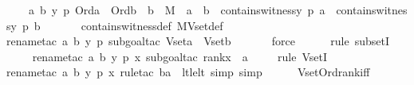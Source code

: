 \begin{isabellebody}
\ \ \ \ {\isachardoublequoteopen}{\isasymAnd}a\ b\ y\ p{\isachardot}{\kern0pt}\ Ord{\isacharparenleft}{\kern0pt}a{\isacharparenright}{\kern0pt}\ {\isasymLongrightarrow}\ Ord{\isacharparenleft}{\kern0pt}b{\isacharparenright}{\kern0pt}\ {\isasymLongrightarrow}\ b\ {\isasymin}\ M\ {\isasymLongrightarrow}\ a\ {\isasymle}\ b\ {\isasymLongrightarrow}\ contains{\isacharunderscore}{\kern0pt}witness{\isacharparenleft}{\kern0pt}y{\isacharcomma}{\kern0pt}\ p{\isacharcomma}{\kern0pt}\ a{\isacharparenright}{\kern0pt}\ {\isasymLongrightarrow}\ contains{\isacharunderscore}{\kern0pt}witness{\isacharparenleft}{\kern0pt}y{\isacharcomma}{\kern0pt}\ p{\isacharcomma}{\kern0pt}\ b{\isacharparenright}{\kern0pt}{\isachardoublequoteclose}\ \isanewline
\ \ \ \ \isamarkupfalse%
\ contains{\isacharunderscore}{\kern0pt}witness{\isacharunderscore}{\kern0pt}def\ MVset{\isacharunderscore}{\kern0pt}def\ \isanewline
\ \ \ \ \isamarkupfalse%
{\isacharparenleft}{\kern0pt}rename{\isacharunderscore}{\kern0pt}tac\ a\ b\ y\ p{\isacharcomma}{\kern0pt}\ subgoal{\isacharunderscore}{\kern0pt}tac\ {\isachardoublequoteopen}Vset{\isacharparenleft}{\kern0pt}a{\isacharparenright}{\kern0pt}\ {\isasymsubseteq}\ Vset{\isacharparenleft}{\kern0pt}b{\isacharparenright}{\kern0pt}{\isachardoublequoteclose}{\isacharparenright}{\kern0pt}\isanewline
\ \ \ \ \ \isamarkupfalse%
\ force\ \isanewline
\ \ \ \ \isamarkupfalse%
{\isacharparenleft}{\kern0pt}rule\ subsetI{\isacharparenright}{\kern0pt}\isanewline
\ \ \ \ \isamarkupfalse%
{\isacharparenleft}{\kern0pt}rename{\isacharunderscore}{\kern0pt}tac\ a\ b\ y\ p\ x{\isacharcomma}{\kern0pt}\ subgoal{\isacharunderscore}{\kern0pt}tac\ {\isachardoublequoteopen}rank{\isacharparenleft}{\kern0pt}x{\isacharparenright}{\kern0pt}\ {\isacharless}{\kern0pt}\ a{\isachardoublequoteclose}{\isacharparenright}{\kern0pt}\isanewline
\ \ \ \ \isamarkupfalse%
{\isacharparenleft}{\kern0pt}rule\ VsetI{\isacharparenright}{\kern0pt}\isanewline
\ \ \ \ \ \isamarkupfalse%
{\isacharparenleft}{\kern0pt}rename{\isacharunderscore}{\kern0pt}tac\ a\ b\ y\ p\ x{\isacharcomma}{\kern0pt}\ rule{\isacharunderscore}{\kern0pt}tac\ b{\isacharequal}{\kern0pt}a\ \ lt{\isacharunderscore}{\kern0pt}le{\isacharunderscore}{\kern0pt}lt{\isacharcomma}{\kern0pt}\ simp{\isacharcomma}{\kern0pt}\ simp{\isacharparenright}{\kern0pt}\isanewline
\ \ \ \ \isamarkupfalse%
\ Vset{\isacharunderscore}{\kern0pt}Ord{\isacharunderscore}{\kern0pt}rank{\isacharunderscore}{\kern0pt}iff\isanewline

\end{isabellebody}
